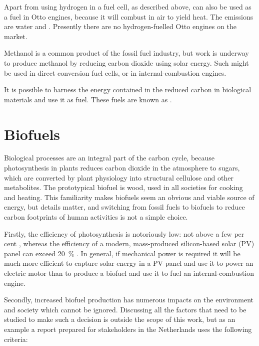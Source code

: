 Apart from using hydrogen in a fuel cell, as described above, 
can also be used as a fuel in Otto engines, because it will combust in air to
yield heat. The emissions are water and \nox. Presently there are no
hydrogen-fuelled Otto engines on the market.

Methanol is a common product of the fossil fuel industry, but work is underway
to produce methanol by reducing carbon dioxide using solar energy. Such
 might be used in direct conversion fuel cells, or in
internal\hyp{}combustion engines.

It is possible to harness the energy contained in the reduced carbon in
biological materials and use it as fuel. These fuels are known as
.

\section{Biofuels}

Biological processes are an integral part of the carbon cycle, because
photosynthesis in plants reduces carbon dioxide in the atmosphere to sugars,
which are converted by plant physiology into structural cellulose and other
metabolites. The prototypical biofuel is wood, used in all societies for cooking
and heating. This familiarity makes biofuels seem an obvious and viable source
of energy, but details matter, and switching from fossil fuels to biofuels to
reduce carbon footprints of human activities is not a simple choice.

Firstly, the efficiency of photosynthesis is notoriously low: not above a few
per cent \autocite{Simkin2019}, whereas the efficiency of a modern,
mass-produced silicon-based solar  (PV) panel can exceed
\SI{20}{\percent} \autocite{Green2019}. In general, if mechanical power is
required it will be much more efficient to capture solar energy in a PV panel
and use it to power an electric motor than to produce a biofuel and use it to
fuel an internal-combustion engine.
 
Secondly, increased biofuel production has numerous impacts on the environment
and society which cannot be ignored. Discussing all the factors that need to be
studied to make such a decision is outside the scope of this work, but as an
example a report prepared for stakeholders in the Netherlands
\autocite{Smeets2006} uses the following criteria:


